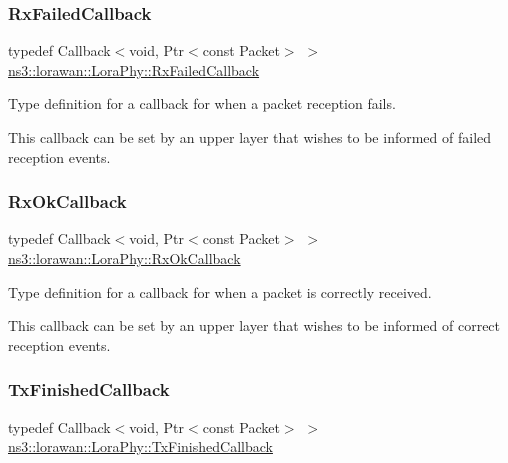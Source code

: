 \subsubsection{\texorpdfstring{Rx\+Failed\+Callback}{RxFailedCallback}}
{\footnotesize\ttfamily typedef Callback$<$void, Ptr$<$const Packet$>$ $>$ \hyperlink{classns3_1_1lorawan_1_1LoraPhy_a2229a4841f407ee9931e563622edf663}{ns3\+::lorawan\+::\+Lora\+Phy\+::\+Rx\+Failed\+Callback}}

Type definition for a callback for when a packet reception fails.

This callback can be set by an upper layer that wishes to be informed of failed reception events. \mbox{\label{classns3_1_1lorawan_1_1LoraPhy_ae9342f40d4eb2b1f004309f6fb444a50}} 
\subsubsection{\texorpdfstring{Rx\+Ok\+Callback}{RxOkCallback}}
{\footnotesize\ttfamily typedef Callback$<$void, Ptr$<$const Packet$>$ $>$ \hyperlink{classns3_1_1lorawan_1_1LoraPhy_ae9342f40d4eb2b1f004309f6fb444a50}{ns3\+::lorawan\+::\+Lora\+Phy\+::\+Rx\+Ok\+Callback}}

Type definition for a callback for when a packet is correctly received.

This callback can be set by an upper layer that wishes to be informed of correct reception events. \mbox{\label{classns3_1_1lorawan_1_1LoraPhy_a3dd8f8ea5717fc775dde00ad54f5402c}} 
\subsubsection{\texorpdfstring{Tx\+Finished\+Callback}{TxFinishedCallback}}
{\footnotesize\ttfamily typedef Callback$<$void, Ptr$<$const Packet$>$ $>$ \hyperlink{classns3_1_1lorawan_1_1LoraPhy_a3dd8f8ea5717fc775dde00ad54f5402c}{ns3\+::lorawan\+::\+Lora\+Phy\+::\+Tx\+Finished\+Callback}}

